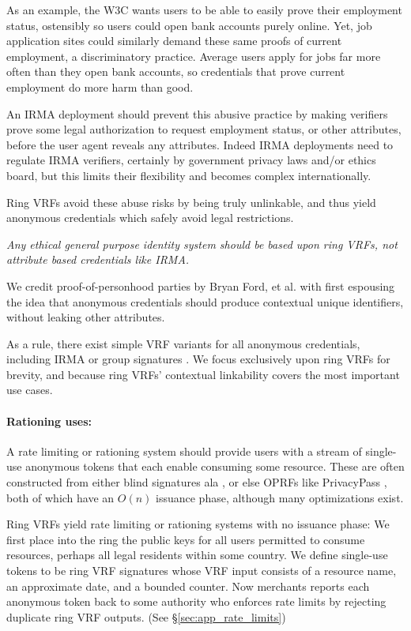 As an example, the W3C wants users to be able to easily prove their
employment status, ostensibly so users could open bank accounts purely
online.  Yet, job application sites could similarly demand these same
proofs of current employment, a discriminatory practice.
Average users apply for jobs far more often than they open bank accounts,
so credentials that prove current employment do more harm than good.

An IRMA deployment should prevent this abusive practice by making
verifiers prove some legal authorization to request employment status,
or other attributes, before the user agent reveals any attributes.
Indeed IRMA deployments need to regulate IRMA verifiers, certainly by
government privacy laws and/or ethics board,
but this limits their flexibility and becomes complex internationally.

Ring VRFs avoid these abuse risks by being truly unlinkable, and thus
yield anonymous credentials which safely avoid legal restrictions.

{\it Any ethical general purpose identity system should be based
upon ring VRFs, not attribute based credentials like IRMA.}

We credit proof-of-personhood parties by Bryan Ford, et al. \cite{pop2008,pop2017}
with first espousing the idea that anonymous credentials should produce
contextual unique identifiers, without leaking other attributes.

As a rule, there exist simple VRF variants for all anonymous credentials,
including IRMA \cite{IRMAcredentials} or group signatures \cite{group_sig_survey}.
We focus exclusively upon ring VRFs for brevity, and because
ring VRFs' contextual linkability covers the most important use cases.

\paragraph{Rationing uses:}

A rate limiting or rationing system should provide users with a stream
of single-use anonymous tokens that each enable consuming some resource.
These are often constructed from either
 blind signatures ala \cite{chaum83}, or else
 OPRFs like PrivacyPass \cite{PrivacyPass},
both of which have an $O(n)$ issuance phase,
 although many optimizations exist.

Ring VRFs yield rate limiting or rationing systems with no issuance phase:\quad 
We first place into the ring the public keys for all users permitted to
consume resources, perhaps all legal residents within some country.  
We define single-use tokens to be ring VRF signatures whose VRF input
consists of a resource name, an approximate date, and a bounded counter.
Now merchants reports each anonymous token back to some authority who
enforces rate limits by rejecting duplicate ring VRF outputs.
(See \S\ref{sec:app_rate_limits})


